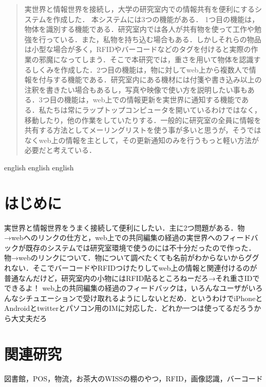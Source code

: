 
\begin{abstract}
実世界と情報世界を接続し，大学の研究室内での情報共有を便利にするシステムを作成した．
本システムには3つの機能がある．
1つ目の機能は，物体を識別する機能である．研究室内では各人が共有物を使って工作や勉強を行っている．また，私物を持ち込む場合もある．しかしそれらの物品は小型な場合が多く，RFIDやバーコードなどのタグを付けると実際の作業の邪魔になってしまう．そこで本研究では，重さを用いて物体を認識するしくみを作成した．2つ目の機能は，物に対してweb上から複数人で情報を付与する機能である．研究室内にある機材には付箋や書き込み以上の注釈を書きたい場合もあるし，写真や映像で使い方を説明したい事もある．3つ目の機能は，web上での情報更新を実世界に通知する機能である．私たちは常にラップトップコンピュータを開いているわけではなく，移動したり，他の作業をしていたりする．一般的に研究室の全員に情報を共有する方法としてメーリングリストを使う事が多いと思うが，そうではなくweb上の情報を主として，その更新通知のみを行うもっと軽い方法が必要だと考えている．
\end{abstract}

\begin{eabstract}
english english english
\end{eabstract}

\maketitle

\section{はじめに}\label{sec:Introduction}
実世界と情報世界をうまく接続して便利にしたい．主に2つ問題がある．物→webへのリンクの仕方と，web上での共同編集の経過の実世界へのフィードバックが既存のシステムでは研究室環境で使うのには不十分だったので作った．
物→webのリンクについて．物について調べたくても名前がわからないからググれない．そこでバーコードやRFIDつけたりしてweb上の情報と関連付けるのが普通なんだけど，研究室内の小物にはRFID貼るところねーだろ→それ重さIDでできるよ！
web上の共同編集の経過のフィードバックは，いろんなユーザがいろんなシチュエーションで受け取れるようにしないとだめ．というわけでiPhoneとAndroidとtwitterとパソコン用のIMに対応した．どれか一つは使ってるだろうから大丈夫だろ


\section{関連研究}
図書館，POS，物流，お茶大のWISSの棚のやつ，RFID，画像認識，バーコード\cite{total}


